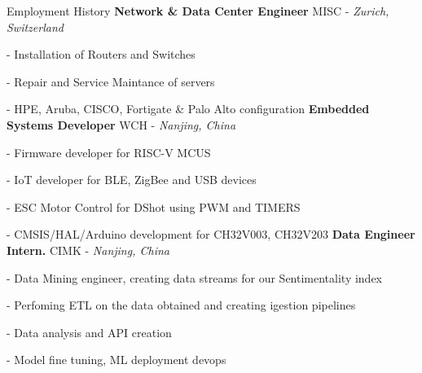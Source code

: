 \begin{rubric}{Employment History}
%
	\textbf{Network \& Data Center Engineer} MISC - \emph{Zurich, Switzerland}
	\par - Installation of Routers and Switches
	\par - Repair and Service Maintance of servers
	\par - HPE, Aruba, CISCO, Fortigate \& Palo Alto configuration
%
%
%
\entry*[2021 -- 2024]%
	\textbf{Embedded Systems Developer} WCH - \emph{Nanjing, China}
	\par - Firmware developer for RISC-V MCUS
	\par - IoT developer for BLE, ZigBee and USB devices
	\par - ESC Motor Control for DShot using PWM and TIMERS
	\par - CMSIS/HAL/Arduino development for CH32V003, CH32V203
%
%
\entry*[2019 -- 2020]%
	\textbf{Data Engineer Intern.} CIMK - \emph{Nanjing, China}
	\par - Data Mining engineer, creating data streams for our Sentimentality index
	\par - Perfoming ETL on the data obtained and creating igestion pipelines
	\par - Data analysis and API creation
	\par - Model fine tuning, ML deployment devops
%
\end{rubric}